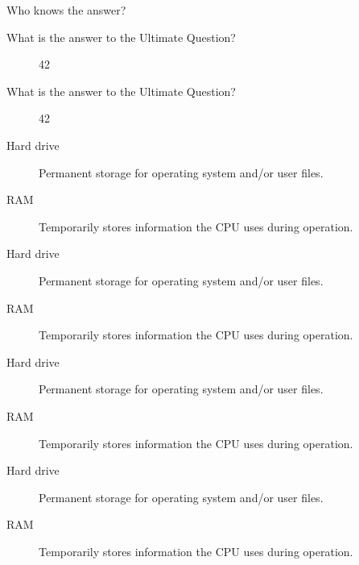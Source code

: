 \begin{description}
\item[Who knows the answer?]\end{description}

\begin{description}
\item[What is the answer to the Ultimate Question?]42
\end{description}

\begin{description}
\item[What is the answer to the Ultimate Question?]42
\end{description}

\begin{description}
\item[Hard drive]Permanent storage for operating system and/or user files.
\item[RAM]Temporarily stores information the CPU uses during operation.
\end{description}

\begin{description}
\item[Hard drive]Permanent storage for operating system and/or user files.
\item[RAM]Temporarily stores information the CPU uses during operation.
\end{description}

\begin{description}
\item[Hard drive]Permanent storage for operating system and/or user files.
\item[RAM]Temporarily stores information the CPU uses during operation.
\end{description}

\begin{description}
\item[Hard drive]Permanent storage for operating system and/or user files.
\item[RAM]Temporarily stores information the CPU uses during operation.
\end{description}


